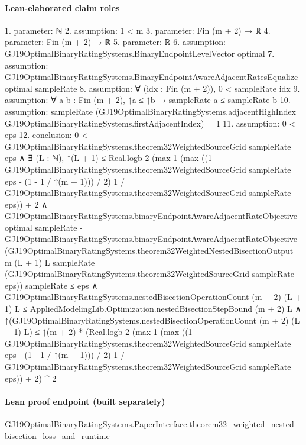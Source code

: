 \documentclass[10pt]{article}
\begin{document}
\paragraph{Lean-elaborated claim roles}\begin{ReviewVerbatim}
1. parameter: ℕ
2. assumption: 1 < m
3. parameter: Fin (m + 2) → ℝ
4. parameter: Fin (m + 2) → ℝ
5. parameter: ℝ
6. assumption: GJ19OptimalBinaryRatingSystems.BinaryEndpointLevelVector optimal
7. assumption: GJ19OptimalBinaryRatingSystems.BinaryEndpointAwareAdjacentRatesEqualize optimal sampleRate
8. assumption: ∀ (idx : Fin (m + 2)), 0 < sampleRate idx
9. assumption: ∀ {a b : Fin (m + 2)}, ↑a ≤ ↑b → sampleRate a ≤ sampleRate b
10. assumption: sampleRate (GJ19OptimalBinaryRatingSystems.adjacentHighIndex GJ19OptimalBinaryRatingSystems.firstAdjacentIndex) = 1
11. assumption: 0 < eps
12. conclusion: 0 < GJ19OptimalBinaryRatingSystems.theorem32WeightedSourceGrid sampleRate eps ∧
  ∃ (L : ℕ),
    ↑(L + 1) ≤
        Real.logb 2
            (max 1
              (max
                  ((1 - GJ19OptimalBinaryRatingSystems.theorem32WeightedSourceGrid sampleRate eps -
                      (1 - 1 / ↑(m + 1))) /
                    2)
                  1 /
                GJ19OptimalBinaryRatingSystems.theorem32WeightedSourceGrid sampleRate eps)) +
          2 ∧
      GJ19OptimalBinaryRatingSystems.binaryEndpointAwareAdjacentRateObjective optimal sampleRate -
            GJ19OptimalBinaryRatingSystems.binaryEndpointAwareAdjacentRateObjective
              (GJ19OptimalBinaryRatingSystems.theorem32WeightedNestedBisectionOutput m (L + 1) L sampleRate
                (GJ19OptimalBinaryRatingSystems.theorem32WeightedSourceGrid sampleRate eps))
              sampleRate ≤
          eps ∧
        GJ19OptimalBinaryRatingSystems.nestedBisectionOperationCount (m + 2) (L + 1) L ≤
            AppliedModelingLib.Optimization.nestedBisectionStepBound (m + 2) L ∧
          ↑(GJ19OptimalBinaryRatingSystems.nestedBisectionOperationCount (m + 2) (L + 1) L) ≤
            ↑(m + 2) *
              (Real.logb 2
                    (max 1
                      (max
                          ((1 - GJ19OptimalBinaryRatingSystems.theorem32WeightedSourceGrid sampleRate eps -
                              (1 - 1 / ↑(m + 1))) /
                            2)
                          1 /
                        GJ19OptimalBinaryRatingSystems.theorem32WeightedSourceGrid sampleRate eps)) +
                  2) ^
                2
\end{ReviewVerbatim}

\paragraph{Lean proof endpoint (built separately)}\begin{ReviewVerbatim}
GJ19OptimalBinaryRatingSystems.PaperInterface.theorem32_weighted_nested_bisection_loss_and_runtime
\end{ReviewVerbatim}
\end{document}
